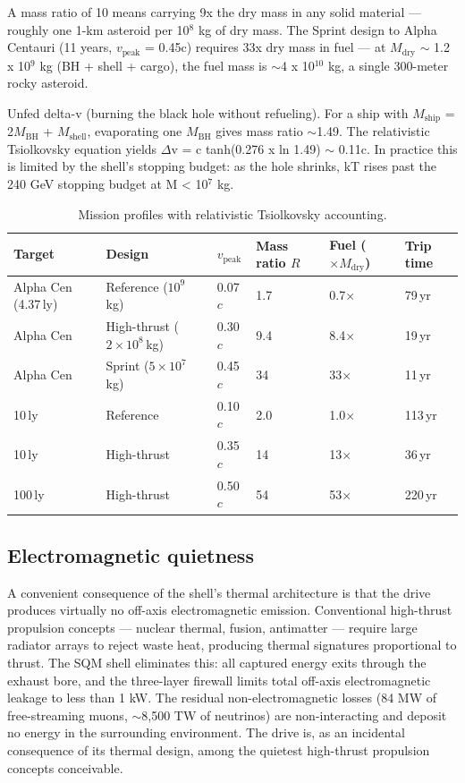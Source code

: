 \documentclass[12pt,a4paper]{article}
\begin{document}
A mass ratio of 10 means carrying 9x the dry mass in any solid material --- roughly one 1-km asteroid per 10$^{8}$ kg of dry mass. The Sprint design to Alpha Centauri (11 years, $v_{\text{peak}}$ = 0.45c) requires 33x dry mass in fuel --- at $M_{\text{dry}}$ $\sim$ 1.2 x 10$^{9}$ kg (BH + shell + cargo), the fuel mass is $\sim$4 x 10$^{10}$ kg, a single 300-meter rocky asteroid.

Unfed delta-v (burning the black hole without refueling). For a ship with $M_{\text{ship}}$ = 2$M_{\text{BH}}$ + $M_{\text{shell}}$, evaporating one $M_{\text{BH}}$ gives mass ratio $\sim$1.49. The relativistic Tsiolkovsky equation yields $\Delta$v = c tanh(0.276 x ln 1.49) $\sim$ 0.11c. In practice this is limited by the shell's stopping budget: as the hole shrinks, kT rises past the 240 GeV stopping budget at M < 10$^{7}$ kg.


\begin{table}[h]
\centering
\caption{Mission profiles with relativistic Tsiolkovsky accounting.}
\label{tab:missions}
\small
\begin{tabular}{llllll}
\hline
\textbf{Target} & \textbf{Design} & \textbf{$v_\text{peak}$} & \textbf{Mass ratio $R$} & \textbf{Fuel ($\times M_\text{dry}$)} & \textbf{Trip time} \\
\hline
Alpha Cen (4.37\,ly) & Reference ($10^9$\,kg) & 0.07$c$ & 1.7 & 0.7$\times$ & 79\,yr \\
Alpha Cen & High-thrust ($2{\times}10^8$\,kg) & 0.30$c$ & 9.4 & 8.4$\times$ & 19\,yr \\
Alpha Cen & Sprint ($5{\times}10^7$\,kg) & 0.45$c$ & 34 & 33$\times$ & 11\,yr \\
10\,ly & Reference & 0.10$c$ & 2.0 & 1.0$\times$ & 113\,yr \\
10\,ly & High-thrust & 0.35$c$ & 14 & 13$\times$ & 36\,yr \\
100\,ly & High-thrust & 0.50$c$ & 54 & 53$\times$ & 220\,yr \\
\hline
\end{tabular}
\end{table}

\subsection{Electromagnetic quietness}
A convenient consequence of the shell's thermal architecture is that the drive produces virtually no off-axis electromagnetic emission. Conventional high-thrust propulsion concepts --- nuclear thermal, fusion, antimatter --- require large radiator arrays to reject waste heat, producing thermal signatures proportional to thrust. The SQM shell eliminates this: all captured energy exits through the exhaust bore, and the three-layer firewall limits total off-axis electromagnetic leakage to less than 1 kW. The residual non-electromagnetic losses (84 MW of free-streaming muons, $\sim$8,500 TW of neutrinos) are non-interacting and deposit no energy in the surrounding environment. The drive is, as an incidental consequence of its thermal design, among the quietest high-thrust propulsion concepts conceivable.
\end{document}
